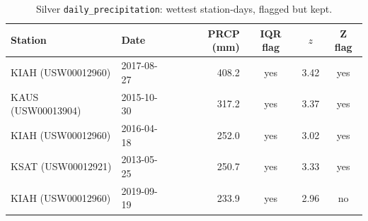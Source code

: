 \begin{table}[H]\centering\small
\caption{Silver \texttt{daily\_precipitation}: wettest station-days, flagged but kept.}\label{tab:wettest}
\begin{tabular}{@{}llrccc@{}}\toprule Station & Date & PRCP (mm) & IQR flag & $z$ & Z flag\\\midrule
KIAH (USW00012960) & 2017-08-27 & 408.2 & yes & 3.42 & yes\\
KAUS (USW00013904) & 2015-10-30 & 317.2 & yes & 3.37 & yes\\
KIAH (USW00012960) & 2016-04-18 & 252.0 & yes & 3.02 & yes\\
KSAT (USW00012921) & 2013-05-25 & 250.7 & yes & 3.33 & yes\\
KIAH (USW00012960) & 2019-09-19 & 233.9 & yes & 2.96 & no\\
\bottomrule\end{tabular}\end{table}